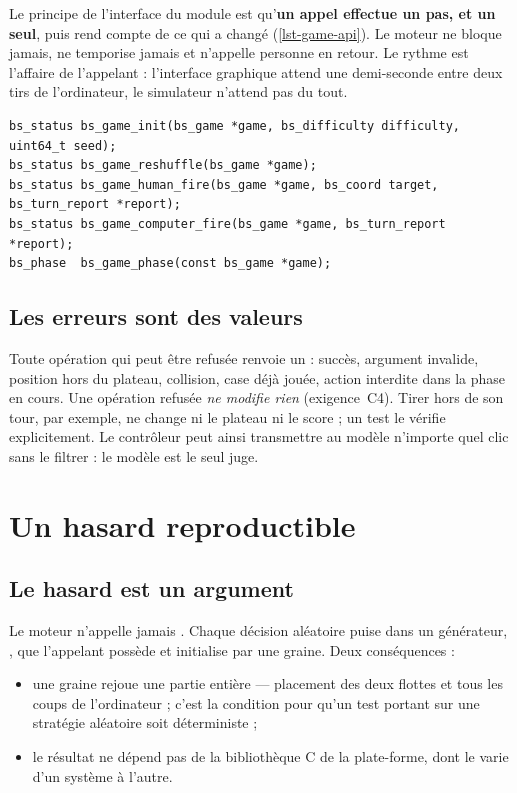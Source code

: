 Le principe de l'interface du module est qu'\textbf{un appel effectue un pas, et un seul},
puis rend compte de ce qui a changé (\cref{lst-game-api}). Le moteur ne bloque jamais, ne
temporise jamais et n'appelle personne en retour. Le rythme est l'affaire de l'appelant :
l'interface graphique attend une demi-seconde entre deux tirs de l'ordinateur, le
simulateur n'attend pas du tout.

\begin{lstlisting}[basicstyle=\ttfamily\footnotesize,
                   caption={L'essentiel de l'interface d'une partie
                            (\fichier{include/battleship/game.h}).}, label={lst-game-api}]
bs_status bs_game_init(bs_game *game, bs_difficulty difficulty, uint64_t seed);
bs_status bs_game_reshuffle(bs_game *game);
bs_status bs_game_human_fire(bs_game *game, bs_coord target, bs_turn_report *report);
bs_status bs_game_computer_fire(bs_game *game, bs_turn_report *report);
bs_phase  bs_game_phase(const bs_game *game);
\end{lstlisting}

\subsection{Les erreurs sont des valeurs}

Toute opération qui peut être refusée renvoie un  : succès, argument
invalide, position hors du plateau, collision, case déjà jouée, action interdite dans la
phase en cours. Une opération refusée \emph{ne modifie rien} (exigence~C4). Tirer hors de
son tour, par exemple, ne change ni le plateau ni le score ; un test le vérifie
explicitement. Le contrôleur peut ainsi transmettre au modèle n'importe quel clic sans le
filtrer : le modèle est le seul juge.

\section{Un hasard reproductible}
\label{sec-hasard}

\subsection{Le hasard est un argument}

Le moteur n'appelle jamais . Chaque décision aléatoire puise dans un
générateur, , que l'appelant possède et initialise par une graine. Deux
conséquences :

\begin{itemize}
    \item une graine rejoue une partie entière --- placement des deux flottes et tous les
          coups de l'ordinateur ; c'est la condition pour qu'un test portant sur une
          stratégie aléatoire soit déterministe ;
    \item le résultat ne dépend pas de la bibliothèque C de la plate-forme, dont le
           varie d'un système à l'autre.
\end{itemize}

